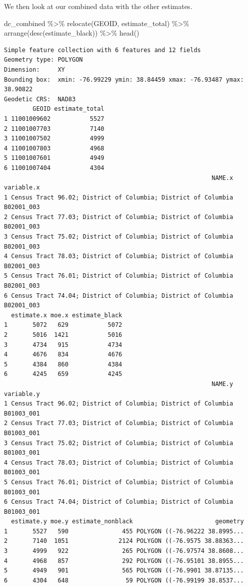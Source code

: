 \documentclass[
  letterpaper,
  DIV=11,
  numbers=noendperiod]{scrartcl}
\newenvironment{Shaded}{\begin{snugshade}}{\end{snugshade}}
\newcommand{\FunctionTok}[1]{\textcolor[rgb]{0.28,0.35,0.67}{#1}}
\newcommand{\NormalTok}[1]{\textcolor[rgb]{0.00,0.23,0.31}{#1}}
\newcommand{\SpecialCharTok}[1]{\textcolor[rgb]{0.37,0.37,0.37}{#1}}
\begin{document}
We then look at our combined data with the other estimates.

\begin{Shaded}
\begin{Highlighting}[]
\NormalTok{dc\_combined }\SpecialCharTok{\%\textgreater{}\%} 
  \FunctionTok{relocate}\NormalTok{(GEOID, estimate\_total) }\SpecialCharTok{\%\textgreater{}\%} 
  \FunctionTok{arrange}\NormalTok{(}\FunctionTok{desc}\NormalTok{(estimate\_black)) }\SpecialCharTok{\%\textgreater{}\%} 
  \FunctionTok{head}\NormalTok{()}
\end{Highlighting}
\end{Shaded}

\begin{verbatim}
Simple feature collection with 6 features and 12 fields
Geometry type: POLYGON
Dimension:     XY
Bounding box:  xmin: -76.99229 ymin: 38.84459 xmax: -76.93487 ymax: 38.90822
Geodetic CRS:  NAD83
        GEOID estimate_total
1 11001009602           5527
2 11001007703           7140
3 11001007502           4999
4 11001007803           4968
5 11001007601           4949
6 11001007404           4304
                                                          NAME.x variable.x
1 Census Tract 96.02; District of Columbia; District of Columbia B02001_003
2 Census Tract 77.03; District of Columbia; District of Columbia B02001_003
3 Census Tract 75.02; District of Columbia; District of Columbia B02001_003
4 Census Tract 78.03; District of Columbia; District of Columbia B02001_003
5 Census Tract 76.01; District of Columbia; District of Columbia B02001_003
6 Census Tract 74.04; District of Columbia; District of Columbia B02001_003
  estimate.x moe.x estimate_black
1       5072   629           5072
2       5016  1421           5016
3       4734   915           4734
4       4676   834           4676
5       4384   860           4384
6       4245   659           4245
                                                          NAME.y variable.y
1 Census Tract 96.02; District of Columbia; District of Columbia B01003_001
2 Census Tract 77.03; District of Columbia; District of Columbia B01003_001
3 Census Tract 75.02; District of Columbia; District of Columbia B01003_001
4 Census Tract 78.03; District of Columbia; District of Columbia B01003_001
5 Census Tract 76.01; District of Columbia; District of Columbia B01003_001
6 Census Tract 74.04; District of Columbia; District of Columbia B01003_001
  estimate.y moe.y estimate_nonblack                       geometry
1       5527   590               455 POLYGON ((-76.96222 38.8995...
2       7140  1051              2124 POLYGON ((-76.9575 38.88363...
3       4999   922               265 POLYGON ((-76.97574 38.8608...
4       4968   857               292 POLYGON ((-76.95101 38.8955...
5       4949   901               565 POLYGON ((-76.9901 38.87135...
6       4304   648                59 POLYGON ((-76.99199 38.8537...
\end{verbatim}
\end{document}
